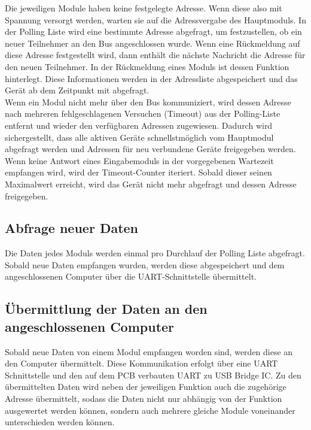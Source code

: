 Die jeweiligen Module haben keine festgelegte Adresse. Wenn diese also mit Spannung versorgt werden, warten sie auf die Adressvergabe des Hauptmoduls. In der Polling Liste wird eine bestimmte Adresse abgefragt, um festzustellen, ob ein neuer Teilnehmer an den Bus angeschlossen wurde. Wenn eine Rückmeldung auf diese Adresse festgestellt wird, dann enthält die nächste Nachricht die Adresse für den neuen Teilnehmer. In der Rückmeldung eines Moduls ist dessen Funktion hinterlegt. Diese Informationen werden in der Adressliste abgespeichert und das Gerät ab dem Zeitpunkt mit abgefragt.\\



Wenn ein Modul nicht mehr über den Bus kommuniziert, wird dessen Adresse nach mehreren fehlgeschlagenen Versuchen (Timeout) aus der Polling-Liste entfernt und wieder den verfügbaren Adressen zugewiesen. Dadurch wird sichergestellt, dass alle aktiven Geräte schnellstmöglich vom Hauptmodul abgefragt werden und Adressen für neu verbundene Geräte freigegeben werden.
\\



Wenn keine Antwort eines Eingabemoduls in der vorgegebenen Wartezeit empfangen wird, wird der Timeout-Counter iteriert. Sobald dieser seinen Maximalwert erreicht, wird das Gerät nicht mehr abgefragt und dessen Adresse freigegeben.


\subsection{Abfrage neuer Daten}
Die Daten jedes Moduls werden einmal pro Durchlauf der Polling Liste abgefragt. Sobald neue Daten empfangen wurden, werden diese abgespeichert und dem angeschlossenen Computer über die UART-Schnittstelle übermittelt.\\



\subsection{Übermittlung der Daten an den angeschlossenen Computer}
Sobald neue Daten von einem Modul empfangen worden sind, werden diese an den Computer übermittelt. Diese Kommunikation erfolgt über eine UART Schnittstelle und den auf dem PCB verbauten UART zu USB Bridge IC. Zu den übermittelten Daten wird neben der jeweiligen Funktion auch die zugehörige Adresse übermittelt, sodass die Daten nicht nur abhängig von der Funktion ausgewertet werden können, sondern auch mehrere gleiche Module voneinander unterschieden werden können.\\


